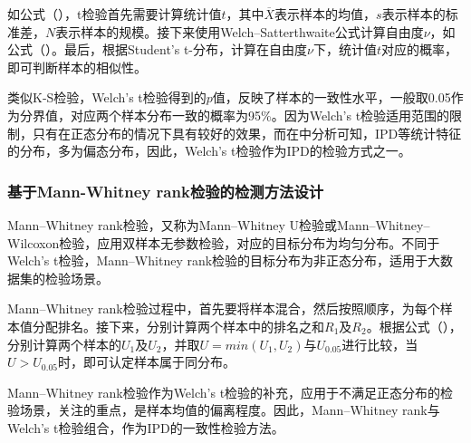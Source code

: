 如公式（），t检验首先需要计算统计值$t$，其中$\overline{X}$表示样本的均值，$s$表示样本的标准差，$N$表示样本的规模。接下来使用Welch–Satterthwaite公式计算自由度$\nu$，如公式（）。最后，根据Student's t-分布，计算在自由度$\nu$下，统计值$t$对应的概率，即可判断样本的相似性。

类似K-S检验，Welch's t检验得到的$p$值，反映了样本的一致性水平，一般取0.05作为分界值，对应两个样本分布一致的概率为95\%。因为Welch’s t检验适用范围的限制，只有在正态分布的情况下具有较好的效果，而在中分析可知，IPD等统计特征的分布，多为偏态分布，因此，Welch's t检验作为IPD的检验方式之一。

\subsubsection{基于Mann-Whitney rank检验的检测方法设计}
\label{chap:analyze:statistical:test:mw}

Mann–Whitney rank检验，又称为Mann–Whitney U检验或Mann–Whitney–Wilcoxon检验，应用双样本无参数检验，对应的目标分布为均匀分布。不同于Welch's t检验，Mann–Whitney rank检验的目标分布为非正态分布，适用于大数据集的检验场景。


Mann–Whitney rank检验过程中，首先要将样本混合，然后按照顺序，为每个样本值分配排名。接下来，分别计算两个样本中的排名之和$R_{1}$及$R_{2}$。根据公式（），分别计算两个样本的$U_{1}$及$U_{2}$，并取$U=min(U_{1},U_{2})$与$U_{0.05}$进行比较，当$U>U_{0.05}$时，即可认定样本属于同分布。

Mann–Whitney rank检验作为Welch's t检验的补充，应用于不满足正态分布的检验场景，关注的重点，是样本均值的偏离程度。因此，Mann–Whitney rank与Welch's t检验组合，作为IPD的一致性检验方法。

